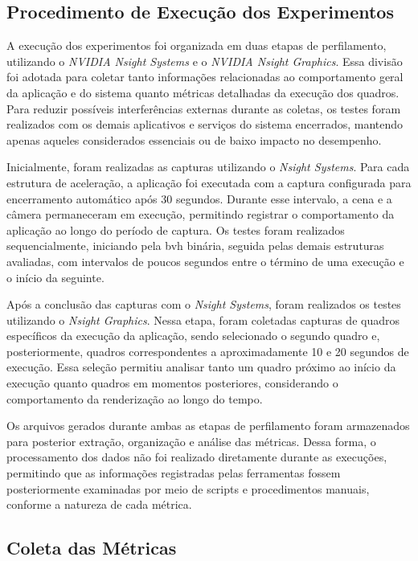 \subsection{Procedimento de Execução dos Experimentos}

A execução dos experimentos foi organizada em duas etapas de perfilamento, utilizando o \textit{NVIDIA Nsight Systems} e o \textit{NVIDIA Nsight Graphics}. Essa divisão foi adotada para coletar tanto informações relacionadas ao comportamento geral da aplicação e do sistema quanto métricas detalhadas da execução dos quadros. Para reduzir possíveis interferências externas durante as coletas, os testes foram realizados com os demais aplicativos e serviços do sistema encerrados, mantendo apenas aqueles considerados essenciais ou de baixo impacto no desempenho.

Inicialmente, foram realizadas as capturas utilizando o \textit{Nsight Systems}. Para cada estrutura de aceleração, a aplicação foi executada com a captura configurada para encerramento automático após 30 segundos. Durante esse intervalo, a cena e a câmera permaneceram em execução, permitindo registrar o comportamento da aplicação ao longo do período de captura. Os testes foram realizados sequencialmente, iniciando pela \gls{bvh} binária, seguida pelas demais estruturas avaliadas, com intervalos de poucos segundos entre o término de uma execução e o início da seguinte.

Após a conclusão das capturas com o \textit{Nsight Systems}, foram realizados os testes utilizando o \textit{Nsight Graphics}. Nessa etapa, foram coletadas capturas de quadros específicos da execução da aplicação, sendo selecionado o segundo quadro e, posteriormente, quadros correspondentes a aproximadamente 10 e 20 segundos de execução. Essa seleção permitiu analisar tanto um quadro próximo ao início da execução quanto quadros em momentos posteriores, considerando o comportamento da renderização ao longo do tempo.

Os arquivos gerados durante ambas as etapas de perfilamento foram armazenados para posterior extração, organização e análise das métricas. Dessa forma, o processamento dos dados não foi realizado diretamente durante as execuções, permitindo que as informações registradas pelas ferramentas fossem posteriormente examinadas por meio de scripts e procedimentos manuais, conforme a natureza de cada métrica.

\subsection{Coleta das Métricas}

